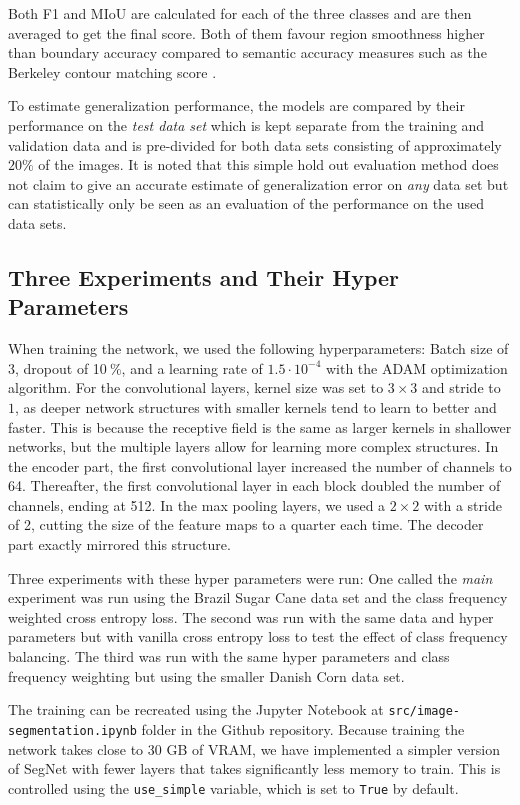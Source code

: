 \documentclass{article}
\newcommand{\pro}{\ensuremath{\ \%}}
\begin{document}
Both F1 and MIoU are calculated for each of the three classes and are then averaged to get the final score. Both of them favour region smoothness higher than boundary accuracy compared to semantic accuracy measures such as the Berkeley contour matching score \cite{seg}.

To estimate generalization performance, the models are compared by their performance on the \textit{test data set} which is kept separate from the training and validation data and is pre-divided for both data sets consisting of approximately \( 20\%\) of the images.  It is noted that this simple hold out evaluation method does not claim to give an accurate estimate of generalization error on \textit{any} data set but can statistically only be seen as an evaluation of the performance on the used data sets. 

\subsection{Three Experiments and Their Hyper Parameters}
When training the network, we used the following hyperparameters: Batch size of 3, dropout of 10\pro, and a learning rate of $ 1.5\cdot 10^{-4} $ with the ADAM optimization algorithm.
For the convolutional layers, kernel size was set to $ 3\times 3 $ and stride to $ 1 $, as deeper network structures with smaller kernels tend to learn to better and faster.
This is because the receptive field is the same as larger kernels in shallower networks, but the multiple layers allow for learning more complex structures.
In the encoder part, the first convolutional layer increased the number of channels to 64.
Thereafter, the first convolutional layer in each block doubled the number of channels, ending at 512.
In the max pooling layers, we used a $ 2\times 2 $ with a stride of 2, cutting the size of the feature maps to a quarter each time.
The decoder part exactly mirrored this structure.

Three experiments with these hyper parameters were run: One called the \textit{main} experiment was run using the Brazil Sugar Cane data set and the class frequency weighted cross entropy loss.  The second was run with the same data and hyper parameters but with vanilla cross entropy loss to test the effect of class frequency balancing. The third was run with the same hyper parameters and class frequency weighting but using the smaller Danish Corn data set.

The training can be recreated using the Jupyter Notebook at \texttt{src/image-segmentation.ipynb} folder in the Github repository.
Because training the network takes close to 30 GB of VRAM, we have implemented a simpler version of SegNet with fewer layers that takes significantly less memory to train.
This is controlled using the \texttt{use\_simple} variable, which is set to \texttt{True} by default.
\end{document}
